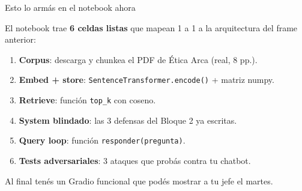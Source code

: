 \documentclass[aspectratio=169, 11pt]{beamer}
\begin{document}
\begin{frame}[shrink]{Esto lo armás en el notebook ahora}
  \vspace{4pt}
  \begin{tcolorbox}[colback=arcaGray, colframe=codeGreen, leftrule=4pt,
    boxrule=0pt, sharp corners, left=10pt, right=10pt, top=6pt, bottom=6pt]
    {\footnotesize\color{arcaDark}
    El notebook trae \textbf{6 celdas listas} que mapean 1 a 1 a la arquitectura del frame anterior:\par}
    \vspace{4pt}
    \begin{enumerate}\setlength{\itemsep}{2pt}
      \footnotesize
      \item[\textbf{1.}] \textbf{Corpus}: descarga y chunkea el PDF de Ética Arca (real, 8 pp.).
      \item[\textbf{2.}] \textbf{Embed + store}: \texttt{SentenceTransformer.encode()} + matriz numpy.
      \item[\textbf{3.}] \textbf{Retrieve}: función \texttt{top\_k} con coseno.
      \item[\textbf{4.}] \textbf{System blindado}: las 3 defensas del Bloque 2 ya escritas.
      \item[\textbf{5.}] \textbf{Query loop}: función \texttt{responder(pregunta)}.
      \item[\textbf{6.}] \textbf{Tests adversariales}: 3 ataques que probás contra tu chatbot.
    \end{enumerate}
  \end{tcolorbox}
  \vspace{6pt}
  {\footnotesize\color{arcaDark}
  Al final tenés un Gradio funcional que podés mostrar a tu jefe el martes.}
\end{frame}
\end{document}
